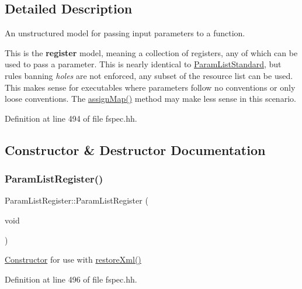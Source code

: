 \subsection{Detailed Description}
An unstructured model for passing input parameters to a function. 

This is the {\bfseries{register}} model, meaning a collection of registers, any of which can be used to pass a parameter. This is nearly identical to \mbox{\hyperlink{class_param_list_standard}{Param\+List\+Standard}}, but rules banning {\itshape holes} are not enforced, any subset of the resource list can be used. This makes sense for executables where parameters follow no conventions or only loose conventions. The \mbox{\hyperlink{class_param_list_standard_a4819bb8291e202e3d11737d586878525}{assign\+Map()}} method may make less sense in this scenario. 

Definition at line 494 of file fspec.\+hh.



\subsection{Constructor \& Destructor Documentation}
\mbox{\label{class_param_list_register_aca64ac19f3dc898fc7d12062c76acf59}} 
\subsubsection{\texorpdfstring{ParamListRegister()}{ParamListRegister()}\hspace{0.1cm}{\footnotesize\ttfamily [1/2]}}
{\footnotesize\ttfamily Param\+List\+Register\+::\+Param\+List\+Register (\begin{DoxyParamCaption}\item[{void}]{ }\end{DoxyParamCaption})\hspace{0.3cm}{\ttfamily [inline]}}



\mbox{\hyperlink{class_constructor}{Constructor}} for use with \mbox{\hyperlink{class_param_list_standard_a7dc8219ff6422f4e23d12643b68eb100}{restore\+Xml()}} 



Definition at line 496 of file fspec.\+hh.

